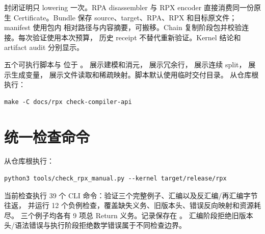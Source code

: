 封闭证明只 lowering 一次。RPA disassembler 与 RPX encoder 直接消费同一份原生
Certificate。Bundle 保存 source、target、RPA、RPX 和目标原文件；manifest 使用包内
相对路径与内容摘要，可搬移。Chain 复制阶段包并校验连接。每次验证使用本次预算，
历史 receipt 不替代重新验证。Kernel 结论和 artifact audit 分别显示。

五个可执行脚本与  位于 。
 展示建模和消元， 展示冗余行，
 展示连续 split， 展示生成变量，
 展示文件读取和稀疏映射。脚本默认使用临时交付目录。
从仓库根执行：
\begin{lstlisting}
make -C docs/rpx check-compiler-api
\end{lstlisting}

\section{统一检查命令}
从仓库根执行：
\begin{lstlisting}
python3 tools/check_rpx_manual.py --kernel target/release/rpx
\end{lstlisting}
当前检查执行 39 个 CLI 命令：验证三个完整例子、汇编以及反汇编/再汇编字节往返，
并运行 12 个负例检查，覆盖缺失义务、旧版本头、错误反向映射和资源耗尽。
三个例子均各有 9 项总 Return 义务。记录保存在 。
汇编阶段拒绝旧版本头/语法错误与执行阶段拒绝数学错误属于不同检查边界。
